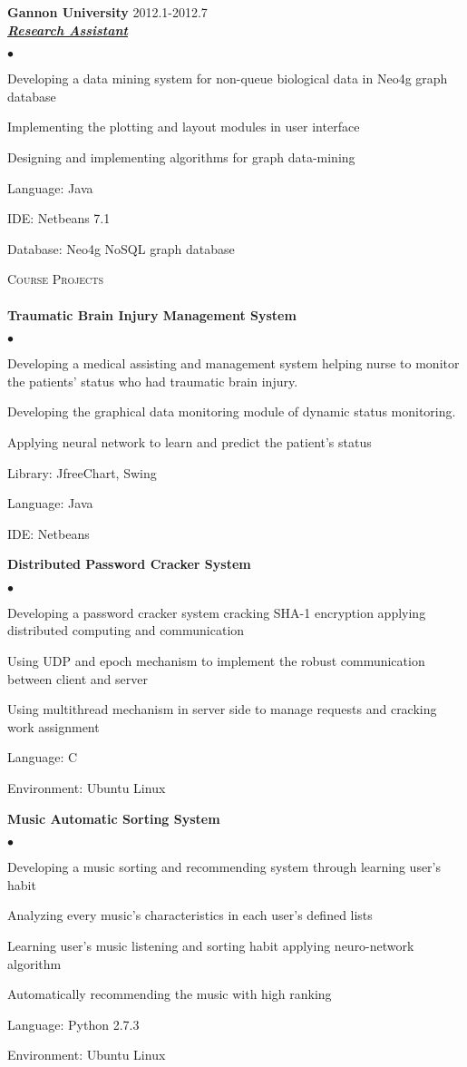 \documentclass{article}
\newcommand{\lineunder}{\vspace*{-8pt} \\ \hspace*{-18pt} \hrulefill \\}
\newcommand{\header}[1]{{\hspace*{-15pt}\vspace*{6pt} \textsc{#1}} \vspace*{-6pt} \lineunder}
\newcommand{\employer}[3]{{ \textbf{#1} \hfill #2\\ \underline{\textbf{\emph{#3}}}\\  }}
\newcommand{\project}[1]{\textbf{#1}}
\newenvironment{achievements}{\begin{list}{$\bullet$}{\topsep 0pt \itemsep -2pt}}{\vspace*{4pt}\end{list}}
\begin{document}
\employer{Gannon University}{2012.1-2012.7}{Research Assistant}
	\begin{achievements}
	\item Developing a data mining system for non-queue biological data in Neo4g graph database 
	\item Implementing the plotting and layout modules in user interface
	\item Designing and implementing algorithms for graph data-mining
	\item Language: Java
	\item IDE: Netbeans 7.1
	\item Database: Neo4g NoSQL graph database
	\end{achievements}

\header{Course Projects}
\project{Traumatic Brain Injury Management System}
\begin{achievements}
	\item Developing a medical assisting and management system helping nurse to monitor the patients' status who had traumatic brain injury.
	\item Developing the graphical data monitoring module of dynamic status monitoring.
	\item Applying neural network to learn and predict the patient's status
	\item Library: JfreeChart, Swing
	\item Language: Java
	\item IDE: Netbeans
\end{achievements}

\project{Distributed Password Cracker System}
\begin{achievements}
	\item Developing a password cracker system cracking SHA-1 encryption applying distributed computing and communication
	\item Using UDP and epoch mechanism to implement the robust communication between client and server
	\item Using multithread mechanism in server side to manage requests and cracking work assignment
	\item Language: C
	\item Environment: Ubuntu Linux
\end{achievements}	

\project{Music Automatic Sorting System}
\begin{achievements}
	\item Developing a music sorting and recommending system through learning user's habit 
	\item Analyzing every music's characteristics in each user's defined lists			
	\item Learning user's music listening and sorting habit applying neuro-network algorithm		
	\item Automatically recommending the music with high ranking
	\item Language: Python 2.7.3
	\item Environment: Ubuntu Linux
\end{achievements}
\end{document}
